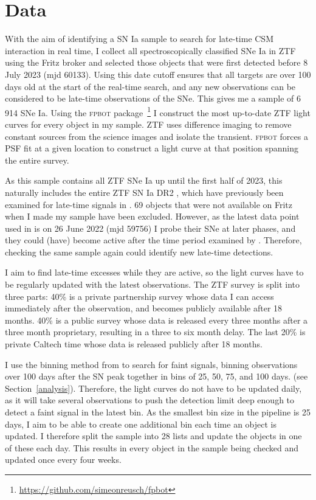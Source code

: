 \documentclass[a4paper,oneside,12pt, class=Latex/Classes/PhDthesisPSnPDF, crop=false]{standalone}
\begin{document}
\section{Data}
\label{data}
With the aim of identifying a SN Ia sample to search for late-time CSM interaction in real time, I collect all spectroscopically classified SNe Ia in ZTF using the Fritz broker \citep{skyportal2019, Skyportal} and selected those objects that were first detected before 8 July 2023 (mjd 60133). Using this date cutoff ensures that all targets are over 100 days old at the start of the real-time search, and any new observations can be considered to be late-time observations of the SNe. This gives me a sample of 6\,914 SNe Ia. Using the \textsc{fpbot} package \citep{fpbot}\,\footnote{\url{https://github.com/simeonreusch/fpbot}} I construct the most up-to-date ZTF light curves for every object in my sample. ZTF uses difference imaging to remove constant sources from the science images and isolate the transient. \textsc{fpbot} forces a PSF fit at a given location to construct a light curve at that position spanning the entire survey.

As this sample contains all ZTF SNe Ia up until the first half of 2023, this naturally includes the entire ZTF SN Ia DR2 \citep[][Smith et al., in prep.]{DR2_Overview}, which have previously been examined for late-time signals in \citet{Terwel_2024_paper1}. 69 objects that were not available on Fritz when I made my sample have been excluded. However, as the latest data point used in \citet{Terwel_2024_paper1} is on 26 June 2022 (mjd 59756) I probe their SNe at later phases, and they could (have) become active after the time period examined by \citet{Terwel_2024_paper1}. Therefore, checking the same sample again could identify new late-time detections.

I aim to find late-time excesses while they are active, so the light curves have to be regularly updated with the latest observations. The ZTF survey is split into three parts: 40\% is a private partnership survey whose data I can access immediately after the observation, and becomes publicly available after 18 months. 40\% is a public survey whose data is released every three months after a three month proprietary, resulting in a three to six month delay. The last 20\% is private Caltech time whose data is released publicly after 18 months.

I use the binning method from \citet{Terwel_2024_paper1} to search for faint signals, binning observations over 100 days after the SN peak together in bins of 25, 50, 75, and 100 days. (see Section~\ref{analysis}). Therefore, the light curves do not have to be updated daily, as it will take several observations to push the detection limit deep enough to detect a faint signal in the latest bin. As the smallest bin size in the pipeline is 25 days, I aim to be able to create one additional bin each time an object is updated. I therefore split the sample into 28 lists and update the objects in one of these each day. This results in every object in the sample being checked and updated once every four weeks.
\end{document}
